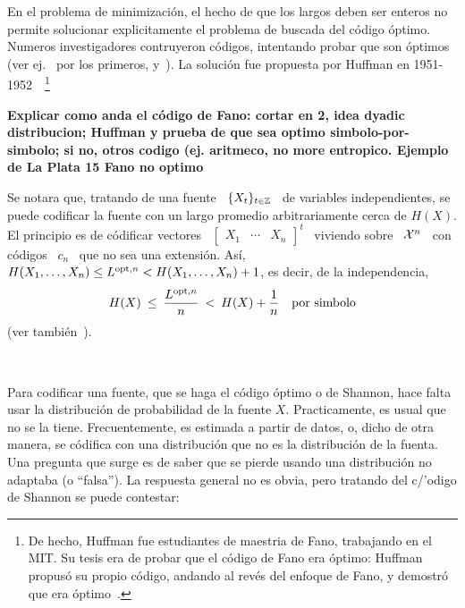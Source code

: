 En el problema  de minimizaci\'on, el hecho de que los  largos deben ser enteros
no  permite  solucionar  explicitamente  el  problema de  buscada  del  c\'odigo
\'optimo.  Numeros  investigadores contruyeron c\'odigos,  intentando probar que
son  \'optimos   (ver  ej.~\cite{Sha48,  ShaWea64,  Fan49}   por  los  primeros,
y~\cite[\&  ref.]{CovTho06}).   La  soluci\'on  fue  propuesta  por  Huffman  en
1951-1952~\cite{Huf52}~\footnote{De hecho,  Huffman fue estudiantes  de maestria
  de Fano, trabajando en el MIT.  Su tesis era de probar que el c\'odigo de Fano
  era \'optimo:  Huffman propus\'o  su propio c\'odigo,  andando al  rev\'es del
  enfoque de Fano, y demostr\'o que era \'optimo~\cite{Sti91}.}
% 

{\bf\color{red} Explicar
  como anda el c\'odigo de Fano: cortar en 2, idea dyadic distribucion; Huffman y prueba de que sea optimo simbolo-por-simbolo; si no, otros codigo (ej. aritmeco, no more entropico. Ejemplo de La Plata 15 Fano no optimo
\cite{Gal78}}

Se notara que, tratando de una fuente \ $\{ X_t \}_{t \in \mathbb{Z}}$ \ de variables
independientes,   se  puede   codificar  la   fuente  con   un   largo  promedio
arbitrariamente  cerca de  $H(X)$. El  principio  es de  c\'odificar vectores  \
$\begin{bmatrix} X_1 & \cdots & X_n \end{bmatrix}^t$ \ viviendo sobre \ $\mathcal{X}^n$ \
con c\'odigos \ $c_n$  \ que no sea una extensi\'on. As\'i,  \ $H(X_1 , \ldots ,
X_n) \le L^{\mathrm{opt},n} < H(X_1 , \ldots , X_n) + 1$, es decir, de la independencia,
%
\[
H(X) \: \le  \: \frac{L^{\mathrm{opt},n}}{n} \: < \: H(X)  + \frac{1}{n} \quad \mbox{por
  simbolo}
\]
%
(ver tambi\'en~\cite[cap. 13, teorema de Shannon]{Rio07}).

\

Para codificar una  fuente, que se haga el c\'odigo \'optimo  o de Shannon, hace
falta usar la distribuci\'on de probabilidad de la fuente $X$. Practicamente, es
usual que  no se  la tiene. Frecuentemente,  es estimada  a partir de  datos, o,
dicho  de  otra manera,  se  c\'odifica  con una  distribuci\'on  que  no es  la
distribuci\'on de  la fuenta. Una pregunta que  surge es de saber  que se pierde
usando una distribuci\'on no adaptaba  (o ``falsa''). La respuesta general no es
obvia, pero tratando del c/'odigo de Shannon se puede contestar:


